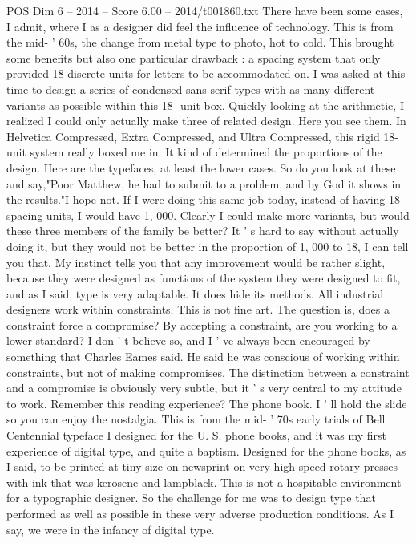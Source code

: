 \begin{textsample}{POS Dim 6 – 2014 – Score 6.00 – 2014/t001860.txt}
There have been some cases, I admit, where I as a designer did feel the influence of technology.
This is from the mid- ' 60s, the change from metal type to photo, hot to cold.
This brought some benefits but also one particular drawback : a spacing system that only provided 18 discrete units for letters to be accommodated on.
I was asked at this time to design a series of condensed sans serif types with as many different variants as possible within this 18- unit box.
Quickly looking at the arithmetic, I realized I could only actually make three of related design.
Here you see them.
In Helvetica Compressed, Extra Compressed, and Ultra Compressed, this rigid 18-unit system really boxed me in.
It kind of determined the proportions of the design.
Here are the typefaces, at least the lower cases.
So do you look at these and say,"Poor Matthew, he had to submit to a problem, and by God it shows in the results."I hope not.
If I were doing this same job today, instead of having 18 spacing units, I would have 1, 000.
Clearly I could make more variants, but would these three members of the family be better?
It ' s hard to say without actually doing it, but they would not be better in the proportion of 1, 000 to 18, I can tell you that.
My instinct tells you that any improvement would be rather slight, because they were designed as functions of the system they were designed to fit, and as I said, type is very adaptable.
It does hide its methods.
All industrial designers work within constraints.
This is not fine art.
The question is, does a constraint force a compromise?
By accepting a constraint, are you working to a lower standard?
I don ' t believe so, and I ' ve always been encouraged by something that Charles Eames said.
He said he was conscious of working within constraints, but not of making compromises.
The distinction between a constraint and a compromise is obviously very subtle, but it ' s very central to my attitude to work.
Remember this reading experience?
The phone book.
I ' ll hold the slide so you can enjoy the nostalgia.
This is from the mid- ' 70s early trials of Bell Centennial typeface I designed for the U.
S. phone books, and it was my first experience of digital type, and quite a baptism.
Designed for the phone books, as I said, to be printed at tiny size on newsprint on very high-speed rotary presses with ink that was kerosene and lampblack.
This is not a hospitable environment for a typographic designer.
So the challenge for me was to design type that performed as well as possible in these very adverse production conditions.
As I say, we were in the infancy of digital type.

\end{textsample}

